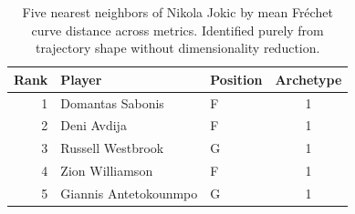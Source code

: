 \begin{table}[htbp]
  \centering\small
  \begin{tabular}{rllc}
    \toprule
    Rank & Player & Position & Archetype \\
    \midrule
    1 & Domantas Sabonis & F & 1 \\
    2 & Deni Avdija & F & 1 \\
    3 & Russell Westbrook & G & 1 \\
    4 & Zion Williamson & F & 1 \\
    5 & Giannis Antetokounmpo & G & 1 \\
    \bottomrule
  \end{tabular}
  \caption{Five nearest neighbors of Nikola Jokic by mean Fr\'{e}chet curve distance across metrics. Identified purely from trajectory shape without dimensionality reduction.}
  \label{tab:Nikola_Jokic_frechet_curve_neighbors}
\end{table}

